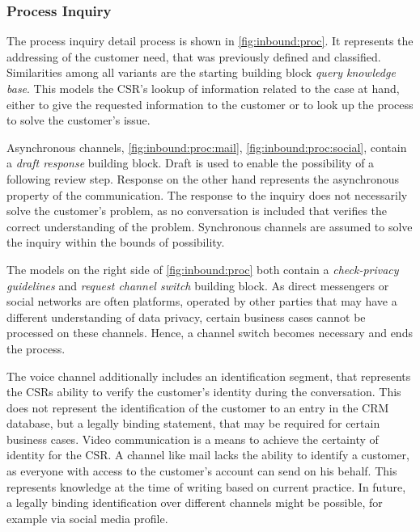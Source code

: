 \subsubsection{Process Inquiry}

The process inquiry detail process is shown in \Fig \ref{fig:inbound:proc}. It represents the addressing of the customer need, that was previously defined and classified. Similarities among all variants are the starting building block \textit{query knowledge base}. This models the \acrshort{CSR}'s lookup of information related to the case at hand, either to give the requested information to the customer or to look up the process to solve the customer's issue.  

Asynchronous channels, \Fig \ref{fig:inbound:proc:mail}, \ref{fig:inbound:proc:social}, contain a \textit{draft response} building block. Draft is used to enable the possibility of a following review step. Response on the other hand represents the asynchronous property of the communication. The response to the inquiry does not necessarily solve the customer's problem, as no conversation is included that verifies the correct understanding of the problem. Synchronous channels are assumed to solve the inquiry within the bounds of possibility. 

The models on the right side of \Fig \ref{fig:inbound:proc} both contain a \textit{check-privacy guidelines} and \textit{request channel switch} building block. As direct messengers or social networks are often platforms, operated by other parties that may have a different understanding of data privacy, certain business cases cannot be processed on these channels. Hence, a channel switch becomes necessary and ends the process. 

The voice channel additionally includes an identification segment, that represents the \acrshort{CSR}s ability to verify the customer's identity during the conversation. This does not represent the identification of the customer to an entry in the \acrshort{CRM} database, but a legally binding statement, that may be required for certain business cases. Video communication is a means to achieve the certainty of identity for the \acrshort{CSR}.
 A channel like mail lacks the ability to identify a customer, as everyone with access to the customer's account can send on his behalf. This represents knowledge at the time of writing based on current practice. In future, a legally binding identification over different channels might be possible, for example via social media profile.

